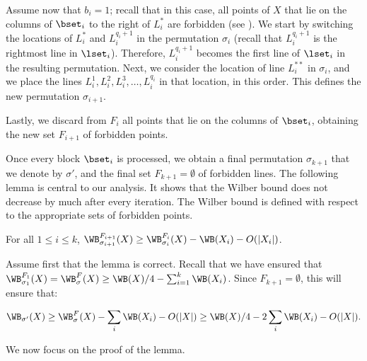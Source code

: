 \documentclass{toc}
\begin{document}
Assume now that $b_i=1$;  recall that in this case, all points of $X$ that lie on the columns of $\bset_i$ to the right of $L^*_i$ are forbidden  (see ). We start by switching the locations of $L^*_i$ and $L_i^{q_i+1}$ in the permutation $\sigma_i$ (recall that $L_i^{q_i+1}$ is the rightmost line in $\lset_i$). Therefore, $L_i^{q_i+1}$ becomes the first line of $\lset_i$ in the resulting permutation. Next, we
consider the location of line $L^{**}_i$ in $\sigma_i$, and we place the lines $L_i^1,L_i^2,L_i^3,\ldots,L_i^{q_i}$ in that location, in this order. This defines the new permutation $\sigma_{i+1}$.

Lastly, we discard from $F_i$ all points that lie on the columns of $\bset_i$, obtaining the new set $F_{i+1}$ of forbidden points.

Once every block $\bset_i$ is processed, we obtain a final permutation $\sigma_{k+1}$ that we denote by $\sigma'$, and the final set $F_{k+1}=\emptyset$ of forbidden lines. The following lemma is central to our analysis. It shows that the Wilber bound does not decrease by much after every iteration. The Wilber bound is defined with respect to the appropriate sets of forbidden points.


\begin{lemma}\label{lemma: small change}
	For all $1\leq i\leq k$,  $\WB^{F_{i+1}}_{\sigma_{i+1}}(X)\geq \WB^{F_i}_{\sigma_i}(X)-\WB(X_i)-O(|X_i|)$.
\end{lemma}

Assume first that the lemma is correct. Recall that we have ensured that $\WB^{F_1}_{\sigma_1}(X)=\WB^F_{\sigma}(X)\geq \WB(X)/4-\sum_{i=1}^k\WB(X_i)$. Since $F_{k+1}=\emptyset$, this will ensure that:

\[\WB_{\sigma'}(X)\geq \WB^F_{\sigma}(X)-\sum_i\WB(X_i)-O(|X|)\geq \WB(X)/4-2\sum_i \WB(X_i)-O(|X|).\]

We now focus on the proof of the lemma.
\end{document}
